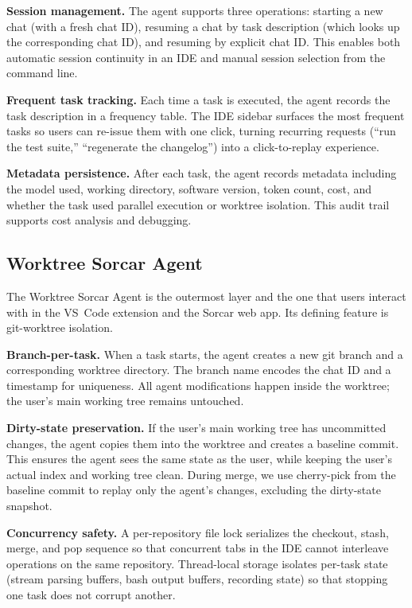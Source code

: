 \documentclass{article}
\begin{document}
\textbf{Session management.}  The agent supports three operations: starting a new chat (with a fresh chat ID), resuming a chat by task description (which looks up the corresponding chat ID), and resuming by explicit chat ID.  This enables both automatic session continuity in an IDE and manual session selection from the command line.

\textbf{Frequent task tracking.}  Each time a task is executed, the agent records the task description in a frequency table.  The IDE sidebar surfaces the most frequent tasks so users can re-issue them with one click, turning recurring requests (``run the test suite,'' ``regenerate the changelog'') into a click-to-replay experience.

\textbf{Metadata persistence.}  After each task, the agent records metadata including the model used, working directory, software version, token count, cost, and whether the task used parallel execution or worktree isolation.  This audit trail supports cost analysis and debugging.

\subsection{Worktree Sorcar Agent}
\label{sec:worktree-agent}

The Worktree Sorcar Agent is the outermost layer and the one that users interact with in the VS~Code extension and the Sorcar web app.  Its defining feature is git-worktree isolation.

\textbf{Branch-per-task.}  When a task starts, the agent creates a new git branch and a corresponding worktree directory.  The branch name encodes the chat ID and a timestamp for uniqueness.  All agent modifications happen inside the worktree; the user's main working tree remains untouched.

\textbf{Dirty-state preservation.}  If the user's main working tree has uncommitted changes, the agent copies them into the worktree and creates a baseline commit.  This ensures the agent sees the same state as the user, while keeping the user's actual index and working tree clean.  During merge, we use cherry-pick from the baseline commit to replay only the agent's changes, excluding the dirty-state snapshot.

\textbf{Concurrency safety.}  A per-repository file lock serializes the checkout, stash, merge, and pop sequence so that concurrent tabs in the IDE cannot interleave operations on the same repository. Thread-local storage isolates per-task state (stream parsing buffers, bash output buffers, recording state) so that stopping one task does not corrupt another.
\end{document}
